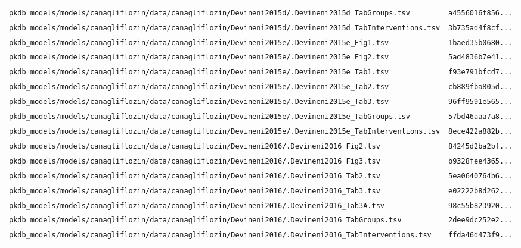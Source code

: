 \begin{longtable}{ll}
\texttt{pkdb\_models/models/canagliflozin/data/canagliflozin/Devineni2015d/.Devineni2015d\_TabGroups.tsv} & \texttt{a4556016f856...} \\
\texttt{pkdb\_models/models/canagliflozin/data/canagliflozin/Devineni2015d/.Devineni2015d\_TabInterventions.tsv} & \texttt{3b735ad4f8cf...} \\
\texttt{pkdb\_models/models/canagliflozin/data/canagliflozin/Devineni2015e/.Devineni2015e\_Fig1.tsv} & \texttt{1baed35b0680...} \\
\texttt{pkdb\_models/models/canagliflozin/data/canagliflozin/Devineni2015e/.Devineni2015e\_Fig2.tsv} & \texttt{5ad4836b7e41...} \\
\texttt{pkdb\_models/models/canagliflozin/data/canagliflozin/Devineni2015e/.Devineni2015e\_Tab1.tsv} & \texttt{f93e791bfcd7...} \\
\texttt{pkdb\_models/models/canagliflozin/data/canagliflozin/Devineni2015e/.Devineni2015e\_Tab2.tsv} & \texttt{cb889fba805d...} \\
\texttt{pkdb\_models/models/canagliflozin/data/canagliflozin/Devineni2015e/.Devineni2015e\_Tab3.tsv} & \texttt{96ff9591e565...} \\
\texttt{pkdb\_models/models/canagliflozin/data/canagliflozin/Devineni2015e/.Devineni2015e\_TabGroups.tsv} & \texttt{57bd46aaa7a8...} \\
\texttt{pkdb\_models/models/canagliflozin/data/canagliflozin/Devineni2015e/.Devineni2015e\_TabInterventions.tsv} & \texttt{8ece422a882b...} \\
\texttt{pkdb\_models/models/canagliflozin/data/canagliflozin/Devineni2016/.Devineni2016\_Fig2.tsv} & \texttt{84245d2ba2bf...} \\
\texttt{pkdb\_models/models/canagliflozin/data/canagliflozin/Devineni2016/.Devineni2016\_Fig3.tsv} & \texttt{b9328fee4365...} \\
\texttt{pkdb\_models/models/canagliflozin/data/canagliflozin/Devineni2016/.Devineni2016\_Tab2.tsv} & \texttt{5ea0640764b6...} \\
\texttt{pkdb\_models/models/canagliflozin/data/canagliflozin/Devineni2016/.Devineni2016\_Tab3.tsv} & \texttt{e02222b8d262...} \\
\texttt{pkdb\_models/models/canagliflozin/data/canagliflozin/Devineni2016/.Devineni2016\_Tab3A.tsv} & \texttt{98c55b823920...} \\
\texttt{pkdb\_models/models/canagliflozin/data/canagliflozin/Devineni2016/.Devineni2016\_TabGroups.tsv} & \texttt{2dee9dc252e2...} \\
\texttt{pkdb\_models/models/canagliflozin/data/canagliflozin/Devineni2016/.Devineni2016\_TabInterventions.tsv} & \texttt{ffda46d473f9...} \\

\end{longtable}
